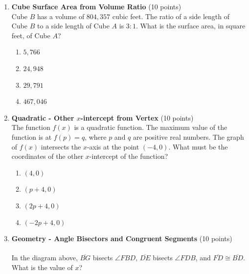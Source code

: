 \begin{enumerate}
  \item \textbf{Cube Surface Area from Volume Ratio} (10 points)\\
  Cube $B$ has a volume of $804{,}357$ cubic feet. The ratio of a side length of Cube $B$ to a side length of Cube $A$ is $3:1$. What is the surface area, in square feet, of Cube $A$?
  \begin{enumerate}[label=(\Alph*)]
    \item $5{,}766$
    \item $24{,}948$
    \item $29{,}791$
    \item $467{,}046$
  \end{enumerate}
  \begin{subanswer}
  \end{subanswer}

  \newpage

  \item \textbf{Quadratic - Other $x$-intercept from Vertex} (10 points)\\
  The function $f(x)$ is a quadratic function. The maximum value of the function is at $f(p)=q$, where $p$ and $q$ are positive real numbers. The graph of $f(x)$ intersects the $x$-axis at the point $(-4,0)$. What must be the coordinates of the other $x$-intercept of the function?
  \begin{enumerate}[label=(\Alph*)]
    \item $(4,0)$
    \item $(p+4,0)$
    \item $(2p+4,0)$
    \item $(-2p+4,0)$
  \end{enumerate}
  \begin{subanswer}
  \end{subanswer}

  \item \textbf{Geometry - Angle Bisectors and Congruent Segments} (10 points)\\
  \\
  In the diagram above, $\overline{BG}$ bisects $\angle FBD$, $\overline{DE}$ bisects $\angle FDB$, and $\overline{FD}\cong\overline{BD}$. What is the value of $x$?
  \begin{subanswer}
  \end{subanswer}

  \newpage


\end{enumerate}

